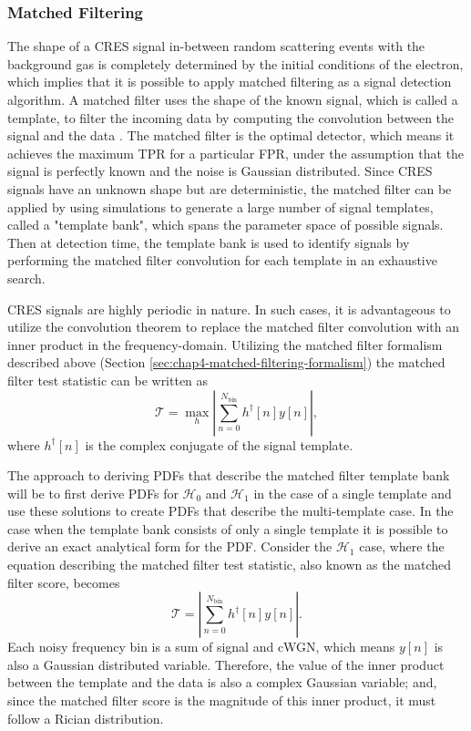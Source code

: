 \subsubsection{Matched Filtering}

The shape of a CRES signal in-between random scattering events with the background gas is completely determined by the initial conditions of the electron, which implies that it is possible to apply matched filtering as a signal detection algorithm. A matched filter uses the shape of the known signal, which is called a template, to filter the incoming data by computing the convolution between the signal and the data \cite{detection_theory}. The matched filter is the optimal detector, which means it achieves the maximum TPR for a particular FPR, under the assumption that the signal is perfectly known and the noise is Gaussian distributed. Since CRES signals have an unknown shape but are deterministic, the matched filter can be applied by using simulations to generate a large number of signal templates, called a "template bank", which spans the parameter space of possible signals. Then at detection time, the template bank is used to identify signals by performing the matched filter convolution for each template in an exhaustive search.

CRES signals are highly periodic in nature. In such cases, it is advantageous to utilize the convolution theorem to replace the matched filter convolution with an inner product in the frequency-domain. Utilizing the matched filter formalism described above (Section \ref{sec:chap4-matched-filtering-formalism}) the matched filter test statistic can be written as
\begin{equation}
    \mathcal{T}=\max_{h}\left|\sum_{n=0}^{N_\mathrm{bin}}h^\dagger[n]y[n]\right|,
    \label{eq:mf_test_stat}
\end{equation}
where $h^\dagger[n]$ is the complex conjugate of the signal template. 

The approach to deriving PDFs that describe the matched filter template bank will be to first derive PDFs for $\mathcal{H}_0$ and $\mathcal{H}_1$ in the case of a single template and use these solutions to create PDFs that describe the multi-template case. In the case when the template bank consists of only a single template it is possible to derive an exact analytical form for the PDF. Consider the $\mathcal{H}_1$ case, where the equation describing the matched filter test statistic, also known as the matched filter score, becomes
\begin{equation}
    \mathcal{T}=\left|\sum_{n=0}^{N_\mathrm{bin}}h^\dagger[n]y[n]\right|.
    \label{eq:mf_inner_prod_1}
\end{equation}
Each noisy frequency bin is a sum of signal and cWGN, which means $y[n]$ is also a Gaussian distributed variable. Therefore, the value of the inner product between the template and the data is also a complex Gaussian variable; and, since the matched filter score is the magnitude of this inner product, it must follow a Rician distribution. 

